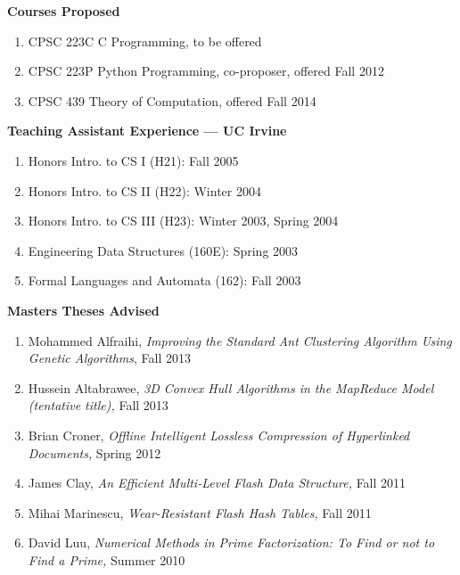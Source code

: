 \documentclass[11pt]{letter}
\begin{document}
\textbf{Courses Proposed}
\begin{enumerate}
\item CPSC 223C C Programming, to be offered
\item CPSC 223P Python Programming, co-proposer, offered Fall 2012
\item CPSC 439 Theory of Computation, offered Fall 2014
\end{enumerate}

\textbf{Teaching Assistant Experience --- UC Irvine}
\begin{enumerate}
\item Honors Intro. to CS I (H21): Fall 2005
\item Honors Intro. to CS II (H22): Winter 2004
\item Honors Intro. to CS III (H23): Winter 2003, Spring 2004
\item Engineering Data Structures (160E): Spring 2003
\item Formal Languages and Automata (162): Fall 2003
\end{enumerate}


\textbf{Masters Theses Advised}
\begin{enumerate}
\item Mohammed Alfraihi, \emph{Improving the Standard Ant Clustering Algorithm Using Genetic Algorithms}, Fall 2013
\item Hussein Altabrawee, \emph{3D Convex Hull Algorithms in the MapReduce Model (tentative title),} Fall 2013
\item Brian Croner, \emph{Offline Intelligent Lossless Compression of Hyperlinked Documents,} Spring 2012
\item James Clay, \emph{An Efficient Multi-Level Flash Data Structure,} Fall 2011
\item Mihai Marinescu, \emph{Wear-Resistant Flash Hash Tables,} Fall 2011
\item David Luu, \emph{Numerical Methods in Prime Factorization: To Find or not to Find a Prime,} Summer 2010
\end{enumerate}
\end{document}
